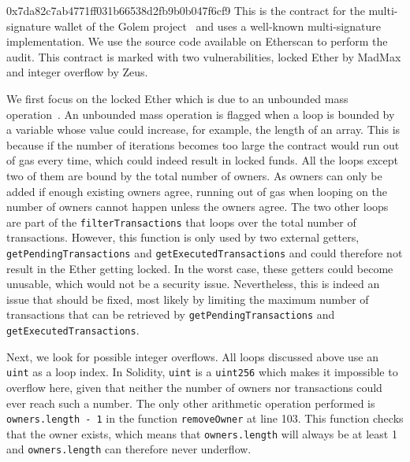 \begin{investigation}{0x7da82c7ab4771ff031b66538d2fb9b0b047f6cf9}
  This is the contract for the multi-signature wallet of the Golem project~\cite{golem-project} and uses a well-known multi-signature implementation. We use the source code available on Etherscan to perform the audit.
  This contract is marked with two vulnerabilities, locked Ether by MadMax and integer overflow by Zeus.

  We first focus on the locked Ether which is due to an unbounded mass operation~\cite{Grech2018}.
  An unbounded mass operation is flagged when a loop is bounded by a variable whose value could increase, for example, the length of an array.
  This is because if the number of iterations becomes too large the contract would run out of gas every time, which could indeed result in locked funds.
  All the loops except two of them are bound by the total number of owners. As owners can only be added if enough existing owners agree, running out of gas when looping on the number of owners cannot happen unless the owners agree.
  The two other loops are part of the \lstinline{filterTransactions} that loops over the total number of transactions.
  However, this function is only used by two external getters, \lstinline{getPendingTransactions} and \lstinline{getExecutedTransactions} and could therefore not result in the Ether getting locked.
  In the worst case, these getters could become unusable, which would not be a security issue.
  Nevertheless, this is indeed an issue that should be fixed, most likely by limiting the maximum number of transactions that can be retrieved by \lstinline{getPendingTransactions} and \lstinline{getExecutedTransactions}.

  Next, we look for possible integer overflows. All loops discussed above use an \lstinline{uint} as a loop index. In Solidity, \lstinline{uint} is a \lstinline{uint256} which makes it impossible to overflow here, given that neither the number of owners nor transactions could ever reach such a number. The only other arithmetic operation performed is \lstinline{owners.length - 1} in the function \lstinline{removeOwner} at line 103. This function checks that the owner exists, which means that \lstinline{owners.length} will always be at least 1 and \lstinline{owners.length} can therefore never underflow.
\end{investigation}

